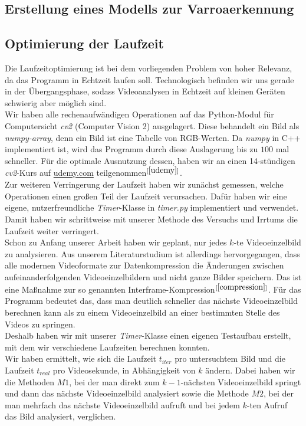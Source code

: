 \documentclass[11pt,a4paper]{article}
\newcommand{\bibRef}[1]{\hyperlink{#1}{$^{[\ref*{#1}{}]}$}}
\begin{document}
\subsection{Erstellung eines Modells zur Varroaerkennung}
\subsection{Optimierung der Laufzeit}
Die Laufzeitoptimierung ist bei dem vorliegenden Problem von hoher Relevanz, da das Programm in Echtzeit laufen soll. Technologisch befinden wir uns gerade in der Übergangsphase, sodass Videoanalysen in Echtzeit auf kleinen Geräten schwierig aber möglich sind.\\
Wir haben alle rechenaufwändigen Operationen auf das Python-Modul für Computersicht \textit{cv2} (Computer Vision 2) ausgelagert. Diese behandelt ein Bild als \textit{numpy-array}, denn ein Bild ist eine Tabelle von RGB-Werten. Da \textit{numpy} in C++ implementiert ist, wird das Programm durch diese Auslagerung bis zu $100$ mal schneller. Für die optimale Ausnutzung dessen, haben wir an einen 14-stündigen \textit{cv2}-Kurs auf \url{udemy.com} teilgenommen\bibRef{udemy}.\\
Zur weiteren Verringerung der Laufzeit haben wir zunächst gemessen, welche Operationen einen großen Teil der Laufzeit verursachen. Dafür haben wir eine eigene, nutzerfreundliche \textit{Timer}-Klasse in \textit{timer.py} implementiert und verwendet. Damit haben wir schrittweise mit unserer Methode des Versuchs und Irrtums die Laufzeit weiter verringert.\\
Schon zu Anfang unserer Arbeit haben wir geplant, nur jedes $k$-te Videoeinzelbild zu analysieren. Aus unserem Literaturstudium ist allerdings hervorgegangen, dass alle modernen Videoformate zur Datenkompression die Änderungen zwischen aufeinanderfolgenden Videoeinzelbildern und nicht ganze Bilder speichern. Das ist eine Maßnahme zur so genannten Interframe-Kompression\bibRef{compression}. Für das Programm bedeutet das, dass man deutlich schneller das nächste Videoeinzelbild berechnen kann als zu einem Videoeinzelbild an einer bestimmten Stelle des Videos zu springen.\\
Deshalb haben wir mit unserer \textit{Timer}-Klasse einen eigenen Testaufbau erstellt, mit dem wir verschiedene Laufzeiten berechnen konnten.\\
Wir haben ermittelt, wie sich die Laufzeit $t_{iter}$ pro untersuchtem Bild und die Laufzeit $t_{real}$ pro Videosekunde, in Abhängigkeit von $k$ ändern. Dabei haben wir die Methoden $M1$, bei der man direkt zum $k-1$-nächsten Videoeinzelbild springt und dann das nächste Videoeinzelbild analysiert sowie die Methode $M2$, bei der man mehrfach das nächste Videoeinzelbild aufruft und bei jedem $k$-ten Aufruf das Bild analysiert, verglichen.
\end{document}

